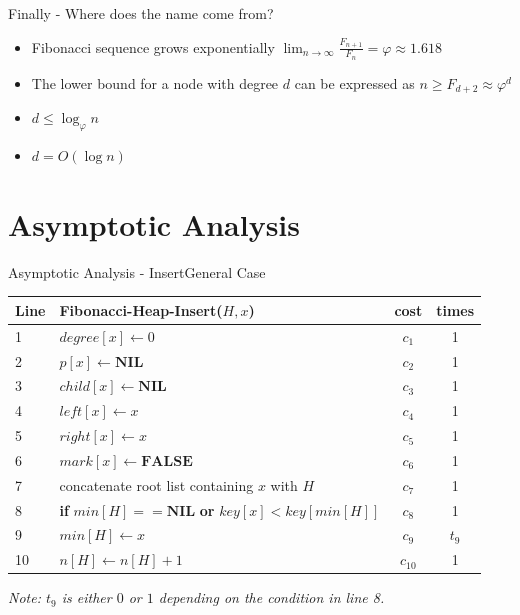 \documentclass{beamer}
\begin{document}
\begin{frame}{Finally - Where does the name come from?}
\begin{itemize}
    \item Fibonacci sequence grows exponentially \(\lim_{n\rightarrow \infty}\frac{F_{n+1}}{F_n}=\varphi \approx 1.618\)
    \item The lower bound for a node with degree \(d\) can be expressed as \(n\geq F_{d+2} \approx \varphi^d\)
    \item \(d\leq \log_{\varphi}n\)
    \item \(d=O(\log n)\)
\end{itemize}
\end{frame}

\section{Asymptotic Analysis}

\begin{frame}{Asymptotic Analysis - Insert}{General Case}
    \small
    \begin{tabular}{llcc}
        \textbf{Line} & \textbf{Fibonacci-Heap-Insert($H, x$)} & \textbf{cost} & \textbf{times} \\
        \hline
        1 & $degree[x] \gets 0$ & $c_1$ & 1 \\
        2 & $p[x] \gets \textbf{NIL}$ & $c_2$ & 1 \\
        3 & $child[x] \gets \textbf{NIL}$ & $c_3$ & 1 \\
        4 & $left[x] \gets x$ & $c_4$ & 1 \\
        5 & $right[x] \gets x$ & $c_5$ & 1 \\
        6 & $mark[x] \gets \textbf{FALSE}$ & $c_6$ & 1 \\
        7 & concatenate root list containing $x$ with $H$ & $c_7$ & 1 \\
        8 & \textbf{if} $min[H] == \textbf{NIL}$ \textbf{or} $key[x] < key[min[H]]$ & $c_8$ & 1 \\
        9 & \quad $min[H] \gets x$ & $c_9$ & $t_9$ \\
        10 & $n[H] \gets n[H] + 1$ & $c_{10}$ & 1 \\
    \end{tabular}
    
    \vspace{0.5cm}
    \textit{Note: $t_9$ is either $0$ or $1$ depending on the condition in line 8.}
\end{frame}
\end{document}
